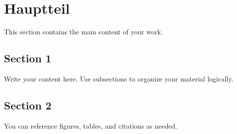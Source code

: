 
\section{Hauptteil}

This section contains the main content of your work.

\subsection{Section 1}

Write your content here. Use subsections to organize your material logically.

\subsection{Section 2}

You can reference figures, tables, and citations as needed.



